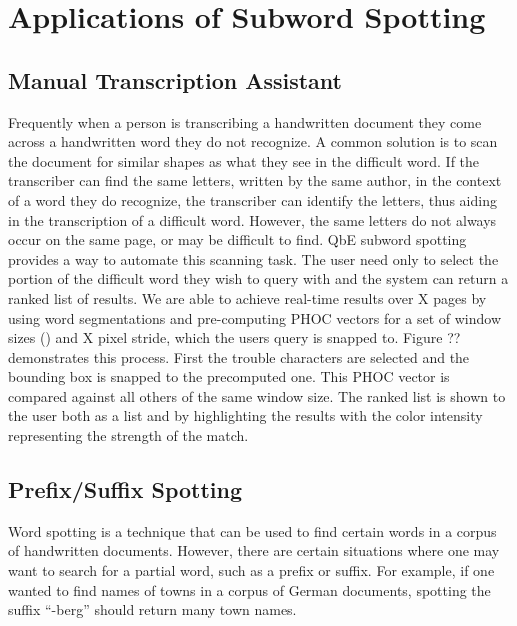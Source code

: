 \documentclass[ms,electronic,twosidetoc,letterpaper,chaptercenter,parttop,lol,lof,lot]{byumsphd}
\begin{document}


\chapter{Applications of Subword Spotting}\label{applications}

\section{Manual Transcription Assistant}
Frequently when a person is transcribing a handwritten document they come across a handwritten word they do not recognize. A common solution is to scan the document for similar shapes as what they see in the difficult word. If the transcriber can find the same letters, written by the same author, in the context of a word they do recognize, the transcriber can identify the letters, thus aiding in the transcription of a difficult word. However, the same letters do not always occur on the same page, or may be difficult to find. QbE subword spotting provides a way to automate this scanning task. The user need only to select the portion of the difficult word they wish to query with and the system can return a ranked list of results.
We are able to achieve real-time results over X pages by using word segmentations and pre-computing PHOC vectors for a set of window sizes () and X  pixel stride, which the users query is snapped to. 
Figure ?? demonstrates this process. First the trouble characters are selected and the bounding box is snapped to the precomputed one. This PHOC vector is compared against all others of the same window size. The ranked list is shown to the user both as a list and by highlighting the results with the color intensity representing the strength of the match.


\section{Prefix/Suffix Spotting}
Word spotting is a technique that can be used to find certain words in a corpus of handwritten documents. However, there are certain situations where one may want to search for a partial word, such as a prefix or suffix. For example, if one wanted to find names of towns in a corpus of German documents, spotting the suffix ``-berg'' should return many town names.
\end{document}
